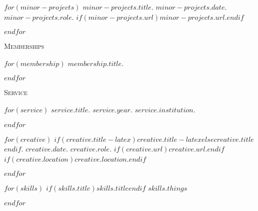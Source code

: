 \documentclass[11pt,article,oneside]{memoir}
\begin{document}
$for(minor-projects)$
\ind \emph{$minor-projects.title$}. \emph{$minor-projects.date$}. $minor-projects.role$. $if(minor-projects.url)$\href{$minor-projects.url$}{$minor-projects.url$}.$endif$
\smallskip

$endfor$


\ind \textsc{Memberships}

\medskip

$for(membership)$
\ind $membership.title$.

\pagebreak[1]
$endfor$

\bigskip

\ind \textsc{Service}

$for(service)$
\ind $service.title$. \emph{$service.year$}. $service.institution$.

\pagebreak[1]
$endfor$

\medskip

\medskip
{}

$for(creative)$
\ind $if(creative.title-latex)$$creative.title-latex$$else$$creative.title$$endif$. \emph{$creative.date$}. $creative.role$. $if(creative.url)$\href{$creative.url$}{$creative.url$}.$endif$ $if(creative.location)$$creative.location$.$endif$

\smallskip
$endfor$

\medskip

\medskip
{}

$for(skills)$
\ind$if(skills.title)$\textbf{$skills.title$}$endif$ $skills.things$

\smallskip

\pagebreak[1]
$endfor$

\bigskip

\thispagestyle{jtmcolophon}
\end{document}
